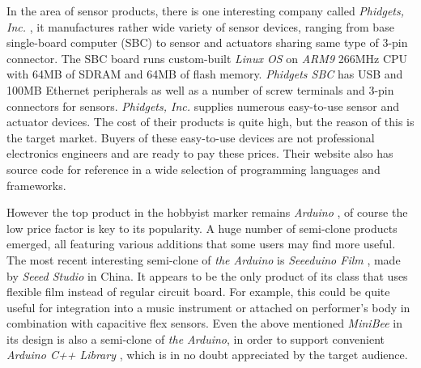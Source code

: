  
 In the area of sensor products, there is one interesting company called
 \emph{Phidgets, Inc.} \cite{links:phidgets:homepage}, it manufactures rather
 wide variety of sensor devices, ranging from base single-board computer (SBC)
 to sensor and actuators sharing same type of 3-pin connector. The SBC board
 runs custom-built \emph{Linux OS} on \emph{ARM9} 266MHz CPU with 64MB of
 SDRAM and 64MB of flash memory. \emph{Phidgets SBC}
 \cite{links:phidgets:products:sbc} has USB and 100MB Ethernet peripherals as
 well as a number of screw terminals and 3-pin connectors for sensors.
 \emph{Phidgets, Inc.} supplies numerous easy-to-use sensor and actuator
 devices. The cost of their products is quite high, but the reason of
 this is the target market. Buyers of these easy-to-use devices are not
 professional electronics engineers and are ready to pay these prices.
 Their website also has source code for reference in a wide selection of
 programming languages and frameworks.
 
 However the top product in the hobbyist marker remains \emph{Arduino}
 \cite{links:arduino:homepage}, of course the low price factor is key to its
 popularity. A huge number of semi-clone products emerged, all featuring
 various additions that some users may find more useful. The most recent
 interesting semi-clone of \emph{the Arduino} is \emph{Seeeduino Film}
 \cite{links:seeed:products:film}, made by \emph{Seeed Studio} in China.
 It appears to be the only product of its class that uses flexible film
 instead of regular circuit board. For example, this could be quite
 useful for integration into a music instrument or attached on performer's
 body in combination with capacitive flex sensors. Even the above mentioned
 \emph{MiniBee} in its design is also a semi-clone of \emph{the Arduino},
 in order to support convenient \emph{Arduino C++ Library}
 \cite{links:arduino:library}, which is in no doubt appreciated by the
 target audience.
